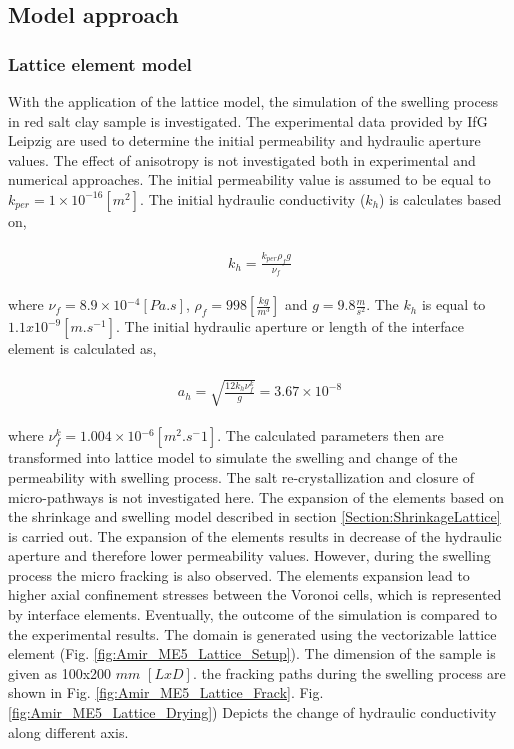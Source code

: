 

\subsection{Model approach}
\subsubsection*{Lattice element model}

With the application of the lattice model, the simulation of the swelling process in red salt clay sample is investigated. The experimental data provided by IfG Leipzig are used to determine the initial permeability and hydraulic aperture values. The effect of anisotropy is not investigated both in experimental and numerical approaches. The initial permeability value is assumed to be equal to $k_{per}=1\times10^{-16} [m^2]$. The initial hydraulic conductivity ($k_{h}$) is calculates based on,

\begin{align}
\label{eq:LEM_ME5_1}
\begin{split}
k_{h}=\frac{k_{per}\rho_fg}{\nu_f}
\end{split}
\end{align}

where $\nu_f=8.9\times{10}{^{-4} [Pa.s]}$, $\rho_f=998 [\frac{kg}{m^3}]$ and $g=9.8 \frac{m}{s^2}$. The $k_{h}$ is equal to $1.1x10^{-9} [m.s^{-1}]$. The initial hydraulic aperture or length of the interface element is calculated as,

\begin{align}
\label{eq:LEM_ME5_2}
\begin{split}
a_h=\sqrt{\frac{12k_h\nu_f^{k}}{g}}=3.67\times10^{-8}
\end{split}
\end{align}

where $\nu_f^{k}=1.004\times{10}{^{-6} [m^2.s^-1]}$. The calculated parameters then are transformed into lattice model to simulate the swelling and change of the permeability with swelling process. The salt re-crystallization and closure of micro-pathways is not investigated here. The expansion of the elements based on the shrinkage and swelling model described in section \ref{Section:ShrinkageLattice} is carried out. The expansion of the elements results in decrease of the hydraulic aperture and therefore lower permeability values. However, during the swelling process the micro fracking is also observed. The elements expansion lead to higher axial confinement stresses between the Voronoi cells, which is represented by interface elements.  Eventually, the outcome of the simulation is compared to the experimental results. The domain is generated using the vectorizable lattice element (Fig. \ref{fig:Amir_ME5_Lattice_Setup}). The dimension of the sample is given as 100x200 $mm$ $[LxD]$. the fracking paths during the swelling process are shown in Fig.
\ref{fig:Amir_ME5_Lattice_Frack}. Fig. \ref{fig:Amir_ME5_Lattice_Drying}) Depicts the change of hydraulic conductivity along different axis. 

